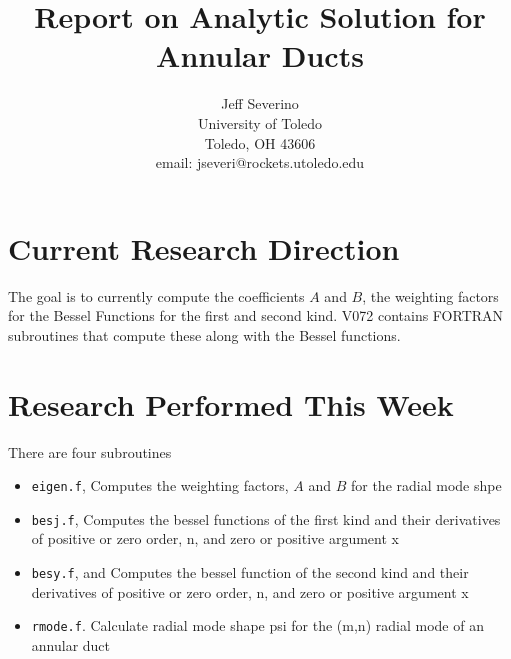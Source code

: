 \documentclass[12pt]{article}
\begin{document}
\begin{titlepage}
\title{
Report on Analytic Solution for Annular Ducts}


\author{ Jeff Severino
 \\
University of Toledo \\
Toledo, OH  43606 \\
email: jseveri@rockets.utoledo.edu  }

\maketitle

\end{titlepage}

\section{Current Research Direction}
 The goal is to currently compute the coefficients $A$ and $B$, the weighting
 factors for the Bessel Functions for the first and second kind. V072
 contains FORTRAN subroutines that compute these along with the Bessel functions.

  
\section{Research Performed This Week}
There are four subroutines 

\begin{itemize}
    \item \verb|eigen.f|, 
        \subitem Computes the weighting factors, $A$ and $B$ for the radial mode
        shpe
    \item \verb|besj.f|, 
        \subitem Computes the bessel functions of the first kind and their derivatives
        of positive or zero order, n, and zero or positive argument x 
    \item \verb|besy.f|, and 
        \subitem Computes the bessel function of the second kind and their 
        derivatives of positive or zero order, n, and zero or positive argument x 
    \item \verb|rmode.f|. 
        \subitem Calculate radial mode shape psi for the (m,n) radial mode of an annular duct 
\end{itemize}
\end{document}
